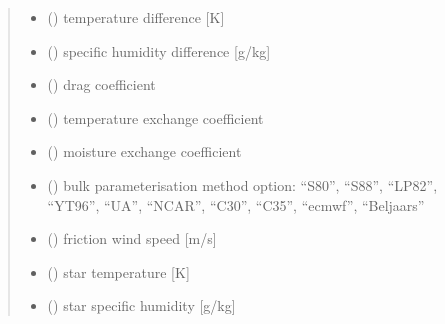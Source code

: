 \documentclass[letterpaper,10pt,english]{sphinxmanual}
\begin{document}
\begin{fulllineitems}
\begin{quote}
\begin{description}
\begin{itemize}
\item {} 
\sphinxAtStartPar
{} () \textendash{} temperature difference       {[}K{]}

\item {} 
\sphinxAtStartPar
{} () \textendash{} specific humidity difference {[}g/kg{]}

\item {} 
\sphinxAtStartPar
{} () \textendash{} drag coefficient

\item {} 
\sphinxAtStartPar
{} () \textendash{} temperature exchange coefficient

\item {} 
\sphinxAtStartPar
{} () \textendash{} moisture exchange coefficient

\item {} 
\sphinxAtStartPar
{} () \textendash{} bulk parameterisation method option: “S80”, “S88”, “LP82”, “YT96”,
“UA”, “NCAR”, “C30”, “C35”, “ecmwf”, “Beljaars”

\end{itemize}

\sphinxAtStartPar
\begin{itemize}
\item {} 
\sphinxAtStartPar
{} () \textendash{} friction wind speed {[}m/s{]}

\item {} 
\sphinxAtStartPar
{} () \textendash{} star temperature    {[}K{]}

\item {} 
\sphinxAtStartPar
{} () \textendash{} star specific humidity {[}g/kg{]}

\end{itemize}


\end{description}\end{quote}

\end{fulllineitems}
\end{document}
